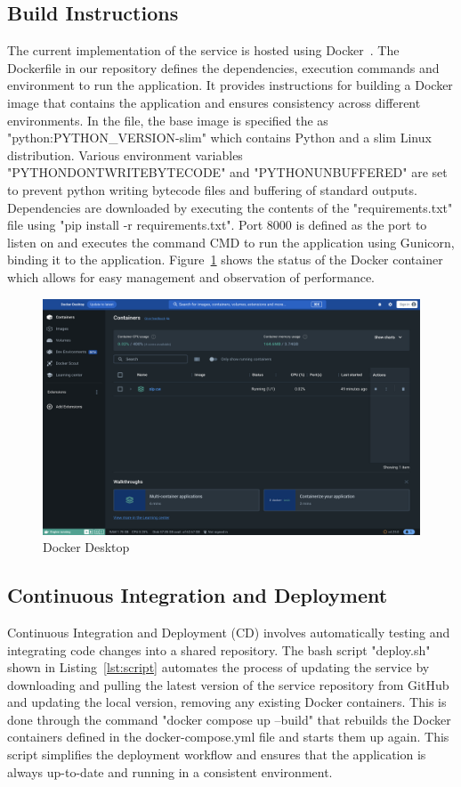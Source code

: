 \documentclass{surreydissertation}
\begin{document}
\subsection{Build Instructions}
The current implementation of the service is hosted using Docker~\cite{docker}. The Dockerfile in our repository defines the dependencies, execution commands and environment to run the application. It provides instructions for building a Docker image that contains the application and ensures consistency across different environments. In the file, the base image is specified the as "python:PYTHON\_VERSION-slim" which contains Python and a slim Linux distribution. Various environment variables "PYTHONDONTWRITEBYTECODE" and "PYTHONUNBUFFERED" are set to prevent python writing bytecode files and buffering of standard outputs. Dependencies are downloaded by executing the contents of the "requirements.txt" file using "pip install -r requirements.txt". Port 8000 is defined as the port to listen on and executes the command CMD to run the application using Gunicorn, binding it to the application. Figure~\ref{fig:docker} shows the status of the Docker container which allows for easy management and observation of performance. 

\begin{figure}[H]
    \centering
    \includegraphics[width=1.0\linewidth]{Figures/docker.png}
    \caption{Docker Desktop}
    \label{fig:docker}
 \end{figure}


\subsection{Continuous Integration and Deployment}
Continuous Integration and Deployment (CD) involves automatically testing and integrating code changes into a shared repository. The bash script "deploy.sh" shown in  Listing~\ref{lst:script}  automates the process of updating the service by downloading and pulling the latest version of the service repository from GitHub and updating the local version, removing any existing Docker containers.  This is done through the command "docker compose up --build" that rebuilds the Docker containers defined in the docker-compose.yml file and starts them up again. This script simplifies the deployment workflow and ensures that the application is always up-to-date and running in a consistent environment.
\end{document}
